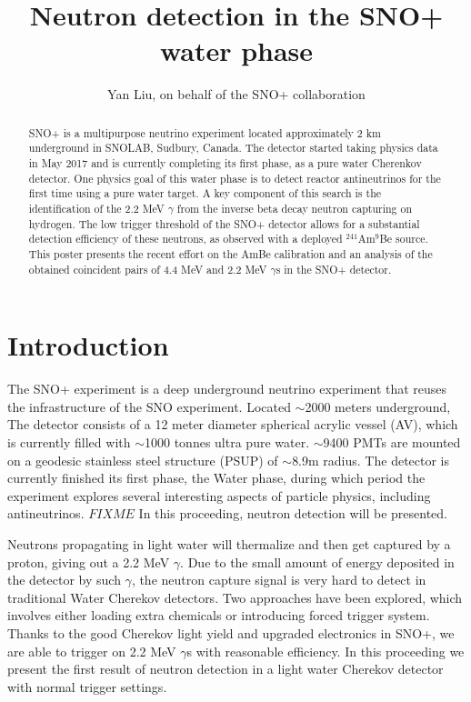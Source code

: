 \documentclass[a4paper]{jpconf}
\begin{document}
\title{Neutron detection in the SNO+ water phase}

\author{Yan Liu, on behalf of the SNO+ collaboration}

\address{Department of Physics, Engineering Physics \& Astronomy, Queen's University, ON, Canada}


\begin{abstract}
SNO+ is a multipurpose neutrino experiment located approximately 2 km underground in SNOLAB, Sudbury, Canada. The detector started taking physics data in May 2017 and is currently completing its first phase, as a pure water Cherenkov detector. One physics goal of this water phase is to detect reactor antineutrinos for the first time using a pure water target. A key component of this search is the identification of the 2.2 MeV $\gamma$ from the inverse beta decay neutron capturing on hydrogen. The low trigger threshold of the SNO+ detector allows for a substantial detection efficiency of these neutrons, as observed with a deployed $^{241}$Am$^{9}$Be source. This poster presents the recent effort on the AmBe calibration and an analysis of the obtained coincident pairs of 4.4 MeV and 2.2 MeV $\gamma$s in the SNO+ detector.
\end{abstract}

\section{Introduction}

The SNO+ experiment \cite{iopartnum} is a deep underground neutrino experiment that reuses the infrastructure of the SNO experiment. Located $\sim$2000 meters underground, The detector consists of a 12 meter diameter spherical acrylic vessel (AV), which is currently filled with $\sim$1000 tonnes ultra pure water. $\sim$9400 PMTs are mounted on a geodesic stainless steel structure (PSUP) of $\sim$8.9m radius. The detector is currently finished its first phase, the Water phase, during which period the experiment explores several interesting aspects of particle physics, including antineutrinos. $FIXME$ In this proceeding, neutron detection will be presented.


Neutrons propagating in light water will thermalize and then get captured by a proton, giving out a 2.2 MeV $\gamma$. Due to the small amount of energy deposited in the detector by such $\gamma$, the neutron capture signal is very hard to detect in traditional Water Cherekov detectors. Two approaches \cite{SK} have been explored, which involves either loading extra chemicals or introducing forced trigger system. Thanks to the good Cherekov light yield and upgraded electronics in SNO+, we are able to trigger on 2.2 MeV $\gamma$s with reasonable efficiency. In this proceeding we present the first result of neutron detection in a light water Cherekov detector with normal trigger settings. 
\end{document}

